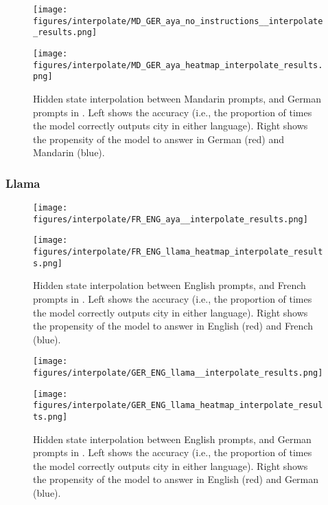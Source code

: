 \begin{figure}[h]
\begin{minipage}{0.49\textwidth}
    \centering
    \texttt{[image: figures/interpolate/MD\_GER\_aya\_no\_instructions\_\_interpolate\_results.png]} 
\end{minipage}
\begin{minipage}{0.49\textwidth}
    \centering
    \texttt{[image: figures/interpolate/MD\_GER\_aya\_heatmap\_interpolate\_results.png]} 
\end{minipage}
\caption{Hidden state interpolation between Mandarin prompts, and German prompts in \aya. Left shows the accuracy (i.e., the proportion of times the model correctly outputs city in either language). Right shows the propensity of the model to answer in German (red) and Mandarin (blue). }
\end{figure}

\FloatBarrier
\newpage 

\subsubsection{Llama} 

\begin{figure}[h]
\begin{minipage}{0.49\textwidth}
    \centering
    \texttt{[image: figures/interpolate/FR\_ENG\_aya\_\_interpolate\_results.png]} 
\end{minipage}
\begin{minipage}{0.49\textwidth}
    \centering
    \texttt{[image: figures/interpolate/FR\_ENG\_llama\_heatmap\_interpolate\_results.png]} 
\end{minipage}
\caption{Hidden state interpolation between English prompts, and French prompts in \llama. Left shows the accuracy (i.e., the proportion of times the model correctly outputs city in either language). Right shows the propensity of the model to answer in English (red) and French (blue). }

\end{figure}


\begin{figure}[h]
\begin{minipage}{0.49\textwidth}
    \centering
    \texttt{[image: figures/interpolate/GER\_ENG\_llama\_\_interpolate\_results.png]} 
\end{minipage}
\begin{minipage}{0.49\textwidth}
    \centering
    \texttt{[image: figures/interpolate/GER\_ENG\_llama\_heatmap\_interpolate\_results.png]} 
\end{minipage}
\caption{Hidden state interpolation between English prompts, and German prompts in \llama. Left shows the accuracy (i.e., the proportion of times the model correctly outputs city in either language). Right shows the propensity of the model to answer in English (red) and German (blue). }
\end{figure}


